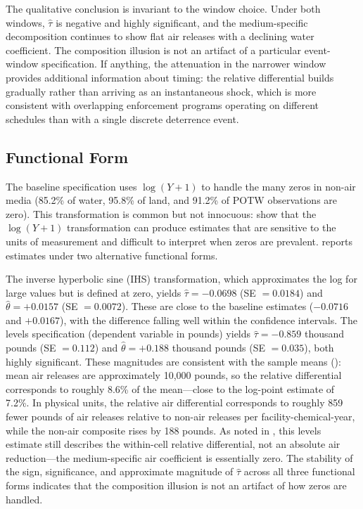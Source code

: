 \documentclass[12pt]{article}
\begin{document}
The qualitative conclusion is invariant to the window choice. Under both windows, $\hat{\tau}$ is negative and highly significant, and the medium-specific decomposition continues to show flat air releases with a declining water coefficient. The composition illusion is not an artifact of a particular event-window specification. If anything, the attenuation in the narrower window provides additional information about timing: the relative differential builds gradually rather than arriving as an instantaneous shock, which is more consistent with overlapping enforcement programs operating on different schedules than with a single discrete deterrence event.

\subsection{Functional Form}

The baseline specification uses $\log(Y + 1)$ to handle the many zeros in non-air media (85.2\% of water, 95.8\% of land, and 91.2\% of POTW observations are zero). This transformation is common but not innocuous: \citet{chenroth2023} show that the $\log(Y + 1)$ transformation can produce estimates that are sensitive to the units of measurement and difficult to interpret when zeros are prevalent.  reports estimates under two alternative functional forms.

The inverse hyperbolic sine (IHS) transformation, which approximates the log for large values but is defined at zero, yields $\hat{\tau} = -0.0698$ (SE $= 0.0184$) and $\hat{\theta} = +0.0157$ (SE $= 0.0072$). These are close to the baseline estimates ($-0.0716$ and $+0.0167$), with the difference falling well within the confidence intervals. The levels specification (dependent variable in pounds) yields $\hat{\tau} = -0.859$ thousand pounds (SE $= 0.112$) and $\hat{\theta} = +0.188$ thousand pounds (SE $= 0.035$), both highly significant. These magnitudes are consistent with the sample means (): mean air releases are approximately 10,000 pounds, so the relative differential corresponds to roughly 8.6\% of the mean---close to the log-point estimate of 7.2\%. In physical units, the relative air differential corresponds to roughly 859 fewer pounds of air releases relative to non-air releases per facility-chemical-year, while the non-air composite rises by 188 pounds. As noted in , this levels estimate still describes the within-cell relative differential, not an absolute air reduction---the medium-specific air coefficient is essentially zero. The stability of the sign, significance, and approximate magnitude of $\hat{\tau}$ across all three functional forms indicates that the composition illusion is not an artifact of how zeros are handled.
\end{document}
